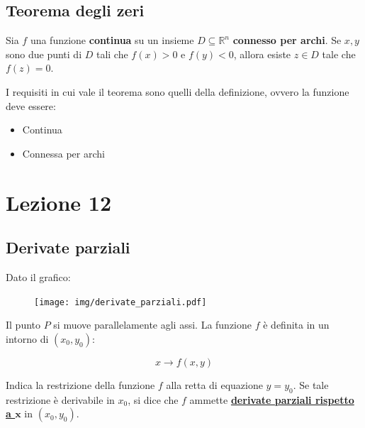 \documentclass[a4paper]{article}
\begin{document}
	\newpage
	
	\subsection{Teorema degli zeri}
	
	Sia $f$ una funzione \textbf{continua} su un insieme $D \subseteq \mathbb{R}^{n}$ \textbf{connesso per archi}.\newline
	Se $x,y$ sono due punti di $D$ tali che $f\left(x\right) > 0$ e $f\left(y\right) < 0$, allora esiste $z \in D$ tale che $f\left(z\right) = 0$.\newline
	
	\noindent
	I requisiti in cui vale il teorema sono quelli della definizione, ovvero la funzione deve essere:
	
	\begin{itemize}
		\item Continua
		\item Connessa per archi
	\end{itemize}

	\newpage
	
	\section{Lezione 12}
	
	\subsection{Derivate parziali}
	
	Dato il grafico:
	
	\begin{figure}[!htp]
		\centering
		\texttt{[image: img/derivate\_parziali.pdf]}
	\end{figure}
	
	\noindent
	Il punto $P$ si muove parallelamente agli assi. La funzione $f$ è definita in un intorno di $\left(x_{0}, y_{0}\right)$:
	
	\begin{equation*}
		x \longrightarrow f\left(x,y\right)
	\end{equation*}

	\noindent
	Indica la restrizione della funzione $f$ alla retta di equazione $y = y_{0}$. Se tale restrizione è derivabile in $x_{0}$, si dice che $f$ ammette \textbf{\underline{derivate parziali rispetto a $\boldsymbol{x}$}} in $\left(x_{0}, y_{0}\right)$.\newline
	
\end{document}
